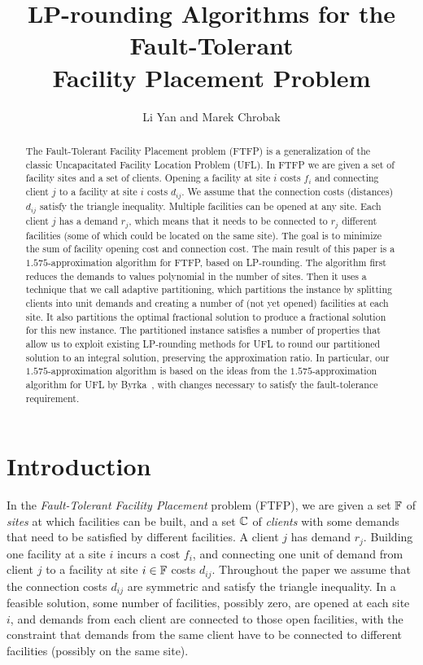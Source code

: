 \documentclass{llncs}
\title{LP-rounding Algorithms for the Fault-Tolerant\\
 		Facility Placement Problem}
\author{Li Yan and Marek Chrobak}
\institute{Computer Science, U of California, Riverside\\
              \email{\{lyan,marek\}@cs.ucr.edu}}
\date{}
\begin{document}
\maketitle

\begin{abstract} 
  The Fault-Tolerant Facility Placement problem (FTFP) is a
  generalization of the classic Uncapacitated Facility Location
  Problem (UFL). In FTFP we are given a set of facility sites and a
  set of clients. Opening a facility at site $i$ costs $f_i$ and
  connecting client $j$ to a facility at site $i$ costs $d_{ij}$. We
  assume that the connection costs (distances) $d_{ij}$ satisfy the
  triangle inequality. Multiple facilities can be opened at any
  site. Each client $j$ has a demand $r_j$, which means that it needs
  to be connected to $r_j$ different facilities (some of which could
  be located on the same site). The goal is to minimize the sum of
  facility opening cost and connection cost. The main result of this
  paper is a $1.575$-approximation algorithm for FTFP, based on
  LP-rounding. The algorithm first reduces the demands to values
  polynomial in the number of sites. Then it uses a technique that we
  call adaptive partitioning, which partitions the instance by
  splitting clients into unit demands and creating a number of (not
  yet opened) facilities at each site. It also partitions the optimal
  fractional solution to produce a fractional solution for this new
  instance.  The partitioned instance satisfies a number of properties
  that allow us to exploit existing LP-rounding methods for UFL to
  round our partitioned solution to an integral solution, preserving
  the approximation ratio.  In particular, our $1.575$-approximation
  algorithm is based on the ideas from the $1.575$-approximation
  algorithm for UFL by Byrka~\etal, with changes necessary to satisfy
  the fault-tolerance requirement.
\end{abstract}

\section{Introduction}

In the \emph{Fault-Tolerant Facility Placement} problem
(FTFP), we are given a set $\mathbb{F}$ of \emph{sites} at
which facilities can be built, and a set $\mathbb{C}$ of
\emph{clients} with some demands that need to be satisfied
by different facilities. A client $j$ has demand
$r_j$. Building one facility at a site $i$ incurs a cost
$f_i$, and connecting one unit of demand from client $j$ to
a facility at site $i\in\mathbb{F}$ costs $d_{ij}$. Throughout the
paper we assume that the connection costs $d_{ij}$ are
symmetric and satisfy the triangle inequality. In a feasible solution, some
number of facilities, possibly zero, are opened at each site
$i$, and demands from each client are connected to those
open facilities, with the constraint that demands from the
same client have to be connected to different
facilities (possibly on the same site).
\end{document}
